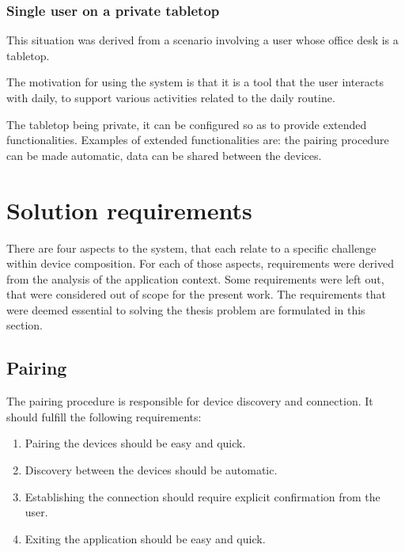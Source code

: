 \subsubsection{Single user on a private tabletop}

This situation was derived from a scenario involving a user whose office desk is a tabletop.

The motivation for using the system is that it is a tool that the user interacts with daily, to support various activities related to the daily routine.

The tabletop being private, it can be configured so as to provide extended functionalities.
Examples of extended functionalities are: the pairing procedure can be made automatic, data can be shared between the devices.


\section{Solution requirements}
\label{sec:requirements}

There are four aspects to the system, that each relate to a specific challenge within device composition.
For each of those aspects, requirements were derived from the analysis of the application context.
Some requirements were left out, that were considered out of scope for the present work.
The requirements that were deemed essential to solving the thesis problem are formulated in this section.

\subsection{Pairing}

The pairing procedure is responsible for device discovery and connection.
It should fulfill the following requirements:

\begin{enumerate}[{RA}-1]
\item Pairing the devices should be easy and quick.
\item Discovery between the devices should be automatic.
\item Establishing the connection should require explicit confirmation from the user.
\item Exiting the application should be easy and quick.
\end{enumerate}

